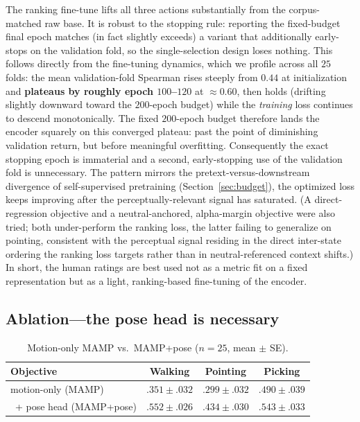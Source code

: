 \documentclass[letterpaper]{article} %
\begin{document}
The ranking fine-tune {lifts all three actions substantially} from the corpus-matched raw
base. It is robust to the stopping rule: reporting the fixed-budget final epoch matches (in fact
slightly exceeds) a variant that additionally early-stops on the validation fold, so the
single-selection design loses nothing. This follows directly from the fine-tuning dynamics,
which we profile across all $25$ folds: the mean validation-fold Spearman rises steeply from
$0.44$ at initialization and \textbf{plateaus by roughly epoch $100$--$120$} at $\approx 0.60$,
then holds (drifting slightly downward toward the $200$-epoch budget) while the \emph{training}
loss continues to descend monotonically. The fixed $200$-epoch budget therefore lands the encoder
squarely on this converged plateau: past the point of diminishing validation return, but before
meaningful overfitting. Consequently the exact stopping epoch is immaterial and a second,
early-stopping use of the validation fold is unnecessary. The pattern mirrors the
pretext-versus-downstream divergence of self-supervised pretraining (Section~\ref{sec:budget}), the
optimized loss keeps improving after the perceptually-relevant signal has saturated. (A
direct-regression objective and a neutral-anchored,
alpha-margin objective were also tried; both under-perform the ranking loss, the latter failing to
generalize on pointing, consistent with the perceptual signal residing in the direct inter-state
ordering the ranking loss targets rather than in neutral-referenced context shifts.) In short, the
human ratings are best used not as a metric fit on a fixed representation but as a {light,
ranking-based fine-tuning of the encoder}.

\subsection{Ablation---the pose head is necessary}
\label{sec:poseablation}
\begin{table}[h]
\centering
\setlength{\tabcolsep}{1pt}
\small
\caption{Motion-only MAMP vs.\ MAMP+pose ($n=25$, mean $\pm$ SE).}
\begin{tabular}{lccc}
\toprule
Objective & Walking & Pointing & Picking \\
\midrule
motion-only (MAMP) & $.351{\scriptstyle\pm}.032$ & $.299{\scriptstyle\pm}.032$ & $.490{\scriptstyle\pm}.039$ \\
{\ + pose head (MAMP+pose)} & $\mathbf{.552{\scriptstyle\pm}.026}$ & $\mathbf{.434{\scriptstyle\pm}.030}$ & $\mathbf{.543{\scriptstyle\pm}.033}$ \\
\bottomrule
\end{tabular}
\end{table}
\end{document}
